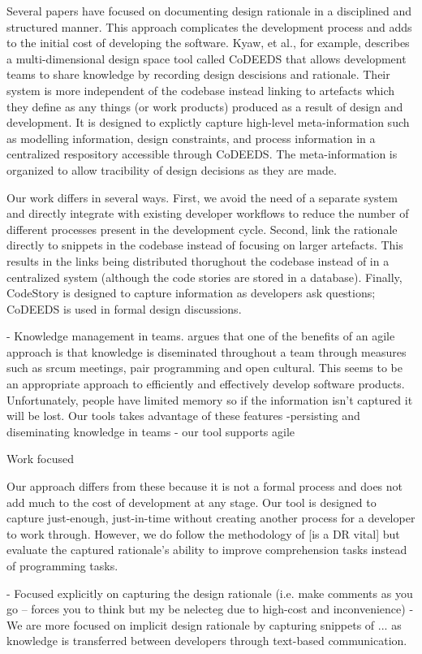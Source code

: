 \documentclass[../manifest.tex]{subfiles}
\begin{document}
Several papers \cite{PK2003, LB2000} have focused on documenting design rationale in a disciplined and structured manner. This approach complicates the development process and adds to the initial cost of developing the software. Kyaw, et al., for example, describes a multi-dimensional design space tool called CoDEEDS that allows development teams to share knowledge by recording design descisions and rationale. Their system is more independent of the codebase instead linking to artefacts which they define as any things (or work products) produced as a result of design and development. It is designed to explictly capture high-level meta-information such as modelling information, design constraints, and process information in a centralized respository accessible through CoDEEDS. The meta-information is organized to allow tracibility of design decisions as they are made.

Our work differs in several ways. First, we avoid the need of a separate system and directly integrate with existing developer workflows to reduce the number of different processes present in the development cycle. Second, link the rationale directly to snippets in the codebase instead of focusing on larger artefacts. This results in the links being distributed thorughout the codebase instead of in a centralized system (although the code stories are stored in a database). Finally, CodeStory is designed to capture information as developers ask questions; CoDEEDS is used in formal design discussions.


- Knowledge management in teams. \cite{AS2012} argues that one of the benefits of an agile approach is that knowledge is diseminated throughout a team through measures such as srcum meetings, pair programming and open cultural. This seems to be an appropriate approach to efficiently and effectively develop software products. Unfortunately, people have limited memory so if the information isn't captured it will be lost. Our tools takes advantage of these features
 -persisting and diseminating knowledge in teams
 - our tool supports agile



Work focused



Our approach differs from these because it is not a formal process and does not add much to the cost of development at any stage. Our tool is designed to capture just-enough, just-in-time without creating another process for a developer to work through. However, we do follow the methodology of [is a DR vital] but evaluate the captured rationale's ability to improve comprehension tasks instead of programming tasks.

- Focused explicitly on capturing the design rationale (i.e. make comments as you go -- forces you to think but my be nelecteg due to high-cost and inconvenience)
- We are more focused on implicit design rationale by capturing snippets of ... as knowledge is transferred between developers through text-based communication.
\end{document}
